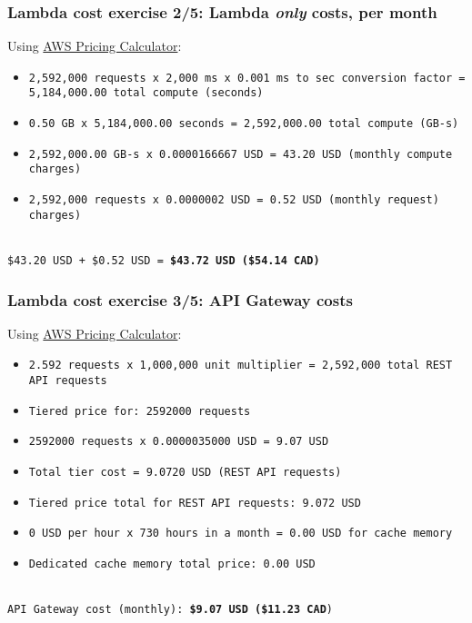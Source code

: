 \documentclass[11pt,aspectratio=169]{beamer}
\begin{document}
\begin{nrcanFrame}
  \frametitle{Lambda cost exercise 2/5: Lambda \textit{only} costs, per month}
  Using
  \href{https://calculator.aws/\#/createCalculator/Lambda}
       {AWS Pricing Calculator}:
  \ \\
      {\footnotesize
        \begin{itemize}
        \item \texttt{2,592,000 requests x 2,000 ms x 0.001 ms to sec conversion factor = 5,184,000.00 total compute (seconds)}
        \item \texttt{0.50 GB x 5,184,000.00 seconds = 2,592,000.00 total compute (GB-s)}
        \item \texttt{2,592,000.00 GB-s x 0.0000166667 USD = 43.20 USD (monthly compute charges)}
        \item \texttt{2,592,000 requests x 0.0000002 USD = 0.52 USD (monthly request) charges)}
        \end{itemize}
        }
            \ \\
      \texttt{\$43.20 USD + \$0.52 USD = \textbf{\$43.72 USD (\$54.14 CAD)}}

\end{nrcanFrame}


\begin{nrcanFrame}
  \frametitle{Lambda cost exercise 3/5: API Gateway costs}
  Using
  \href{https://calculator.aws/\#/createCalculator/APIGateway}{AWS
    Pricing Calculator}:
  \ \\ \vspace{1mm}
        {\footnotesize 
            \begin{itemize}
            \item
              \texttt{2.592 requests x 1,000,000 unit multiplier = 2,592,000 total REST API requests}
            \item
              \texttt{Tiered price for: 2592000 requests}
            \item \texttt{2592000 requests x 0.0000035000 USD = 9.07 USD}
            \item \texttt{Total tier cost = 9.0720 USD (REST API requests)}
            \item \texttt{Tiered price total for REST API requests: 9.072 USD}
            \item \texttt{0 USD per hour x 730 hours in a month = 0.00 USD for cache memory}
            \item \texttt{Dedicated cache memory total price: 0.00 USD}
            \end{itemize}
            }
    \ \\
    \texttt{API Gateway cost (monthly): \textbf{\$9.07 USD (\$11.23 CAD})}\\

\end{nrcanFrame}
\end{document}
